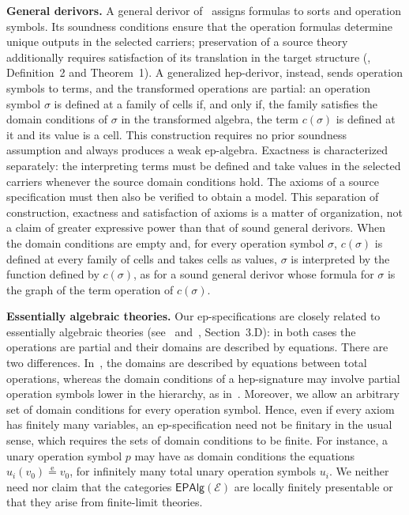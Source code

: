\documentclass[a4paper, reqno]{amsbook}
\newcommand{\spec}[1]{\boldsymbol{\mathcal{#1}}} %
\newcommand{\eeq}{\overset{\mathrm e}{=}}      %
\theoremstyle{plain}
\theoremstyle{definition}
\begin{document}
\textbf{General derivors.}
A general derivor of~\cite{LucasGutierrez2018} assigns formulas to sorts and operation symbols.
Its soundness conditions ensure that the operation formulas determine unique outputs in the selected carriers; preservation of a source theory additionally requires satisfaction of its translation in the target structure (\cite{LucasGutierrez2018}, Definition~2 and Theorem~1).
A generalized hep-derivor, instead, sends operation symbols to terms, and the transformed operations are partial: an operation symbol $\sigma$ is defined at a family of cells if, and only if, the family satisfies the domain conditions of $\sigma$ in the transformed algebra, the term $c(\sigma)$ is defined at it and its value is a cell.
This construction requires no prior soundness assumption and always produces a weak ep-algebra.
Exactness is characterized separately: the interpreting terms must be defined and take values in the selected carriers whenever the source domain conditions hold.
The axioms of a source specification must then also be verified to obtain a model.
This separation of construction, exactness and satisfaction of axioms is a matter of organization, not a claim of greater expressive power than that of sound general derivors.
When the domain conditions are empty and, for every operation symbol $\sigma$, $c(\sigma)$ is defined at every family of cells and takes cells as values, $\sigma$ is interpreted by the function defined by $c(\sigma)$, as for a sound general derivor whose formula for $\sigma$ is the graph of the term operation of $c(\sigma)$.

\textbf{Essentially algebraic theories.}
Our ep-specifications are closely related to essentially algebraic theories (see~\cite{Reichel1987} and~\cite{AdamekRosicky1994}, Section~3.D): in both cases the operations are partial and their domains are described by equations.
There are two differences.
In~\cite{AdamekRosicky1994}, the domains are described by equations between total operations, whereas the domain conditions of a hep-signature may involve partial operation symbols lower in the hierarchy, as in~\cite{Reichel1987}.
Moreover, we allow an arbitrary set of domain conditions for every operation symbol. Hence, even if every axiom has finitely many variables, an ep-specification need not be finitary in the usual sense, which requires the sets of domain conditions to be finite. For instance, a unary operation symbol $p$ may have as domain conditions the equations $u_{i}(v_{0})\eeq v_{0}$, for infinitely many total unary operation symbols $u_{i}$.
We neither need nor claim that the categories $\mathsf{EPAlg}(\spec{E})$ are locally finitely presentable or that they arise from finite-limit theories.
\end{document}
